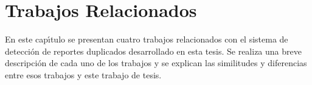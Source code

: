 \chapter{Trabajos Relacionados}
\label{trabajosRelacionados}

En este cap\'{\i}tulo se presentan cuatro trabajos relacionados con el sistema de detecci\'{o}n de reportes duplicados desarrollado en esta tesis. Se realiza una breve descripci\'{o}n de cada uno de los trabajos y se explican las similitudes y diferencias entre esos trabajos y este trabajo de tesis.

\clearpage
